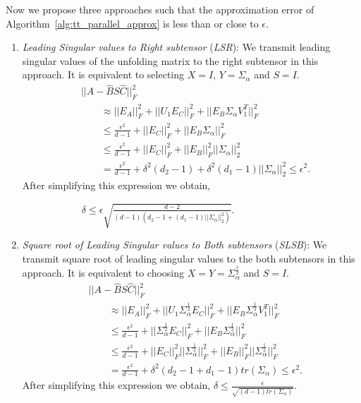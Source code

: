 \documentclass[sigconf]{acmart}
\newcommand{\hfirst}{{\it LSR}\xspace}
\newcommand{\hsecond}{{\it SLSB}\xspace}
\begin{document}
\noindent Now we propose three approaches such that the approximation error of Algorithm~\ref{alg:tt_parallel_approx} is less than or close to $\epsilon$.
\begin{enumerate}
	\item \textit{Leading Singular values to Right subtensor} (\hfirst): We transmit leading singular values of the unfolding matrix to the right subtensor in this approach. It is equivalent to selecting $X = I$, $Y = \Sigma_\alpha$ and $S = I$.	
	\begin{align*}
	&||A - \hat{B} S \hat{C}||_F^2\\ 
	&\qquad\approx ||E_A||_F^2 + ||U_1E_C||_F^2 + ||E_B\Sigma_\alpha V_1^T||_F^2 \\
	&\qquad\le \frac{\epsilon^2}{d-1} + ||E_C||_F^2 + ||E_B\Sigma_\alpha||_F^2 \\
	&\qquad\le \frac{\epsilon^2}{d-1} + ||E_C||_F^2 + ||E_B||_F^2 ||\Sigma_\alpha||_2^2 \\
	&\qquad= \frac{\epsilon^2}{d-1} + \delta^2 (d_2-1)+ \delta^2 (d_1-1) ||\Sigma_\alpha||_2^2\le \epsilon^2.
	\end{align*}
	\noindent After simplifying this expression we obtain,
	
	 $\qquad\qquad\qquad\delta \le \epsilon \sqrt{\frac{d-2}{(d-1) (d_2 -1 + (d_1-1) ||\Sigma_\alpha||_2^2)}}$.
	
	
	\item \textit{Square root of Leading Singular values to Both subtensors} (\hsecond): We transmit square root of leading singular values to the both subtensors in this approach. It is equivalent to choosing $X=Y=\Sigma_\alpha^{\frac{1}{2}}$ and $S=I$.	
	\begin{align*}
	&||A - \hat{B} S \hat{C}||_F^2\\
	&\qquad\approx ||E_A||_F^2 + ||U_1 \Sigma_\alpha^{\frac{1}{2}} E_C||_F^2 + ||E_B \Sigma_\alpha^{\frac{1}{2}} V_1^T||_F^2 \\
	&\qquad\le \frac{\epsilon^2}{d-1} + ||\Sigma_\alpha^{\frac{1}{2}} E_C||_F^2 + ||E_B \Sigma_\alpha^{\frac{1}{2}}||_F^2 \\
	&\qquad\le \frac{\epsilon^2}{d-1} + ||E_C||_F^2 ||\Sigma_\alpha^{\frac{1}{2}}||_F^2 + ||E_B||_F^2 ||\Sigma_\alpha^{\frac{1}{2}}||_F^2 \\
	&\qquad=\frac{\epsilon^2}{d-1} + \delta^2( d_2-1 + d_1 -1) tr(\Sigma_\alpha)\le \epsilon^2.
	\end{align*} 
	\noindent After simplifying this expression we obtain, $\delta \le \frac{\epsilon}{\sqrt{(d-1)tr(\Sigma_\alpha)}}$.
	

\end{enumerate}
\end{document}

